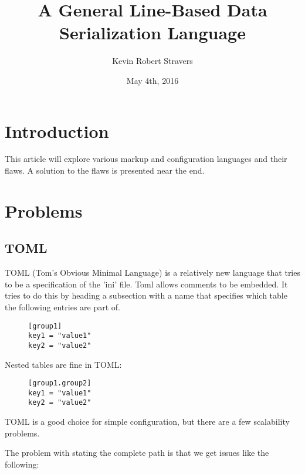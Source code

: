 \documentclass[listof=totoc]{article}
\title{A General Line-Based Data Serialization Language}
\author{Kevin Robert Stravers}
\date{May 4th, 2016}
\begin{document}
\maketitle

\iffalse
  \tableofcontents
  \lstlistoflistings
\fi

\section{Introduction}
\noindent This article will explore various markup and configuration languages and their flaws. A solution to the flaws is presented near the end.

\section{Problems}
\subsection{TOML}
\noindent TOML (Tom's Obvious Minimal Language) is a relatively new language that tries to be a specification of the 'ini' file. Toml allows comments to be embedded.
It tries to do this by heading a subsection with a name that specifies which table the following entries are part of.


\begin{figure}[H]
\centering
\begin{varwidth}{\linewidth}
\begin{verbatim}
[group1]
key1 = "value1"
key2 = "value2"
\end{verbatim}
\end{varwidth}
\caption{}
\end{figure}

\noindent Nested tables are fine in TOML:

\begin{figure}[H]
\centering
\begin{varwidth}{\linewidth}
\begin{verbatim}
[group1.group2]
key1 = "value1"
key2 = "value2"
\end{verbatim}
\end{varwidth}
\caption{}
\end{figure}

\noindent TOML is a good choice for simple configuration, but there are a few scalability problems.


\noindent The problem with stating the complete path is that we get issues like the following:
\end{document}
